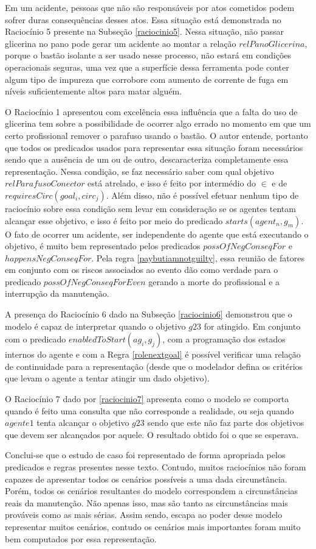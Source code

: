 Em um acidente, pessoas que não são responsáveis por atos cometidos podem sofrer duras consequências desses atos. Essa situação está demonstrada no Raciocínio 5 presente na Subseção \ref{raciocinio5}. Nessa situação, não passar glicerina no pano pode gerar um acidente ao montar a relação $relPanoGlicerina$, porque o bastão isolante a ser usado nesse  processo, não estará em condições operacionais seguras, uma vez que a superfície dessa ferramenta pode conter algum tipo de impureza que corrobore com aumento de corrente de fuga em níveis suficientemente altos para matar alguém. 

O Raciocínio 1 apresentou com excelência essa influência que a falta do uso de glicerina tem sobre a possibilidade de ocorrer algo errado no momento em que um certo profissional remover o parafuso usando o bastão. O autor entende, portanto que todos os predicados usados para representar essa situação foram necessários sendo que a ausência de um ou de outro, descaracteriza completamente essa representação. Nessa condição, se faz necessário saber com qual objetivo $relParafusoConector$ está atrelado, e isso é feito por intermédio do $\in$ e de $requiresCirc(goal_i,circ_j)$. Além disso, não é possível efetuar nenhum tipo de raciocínio sobre essa condição sem levar em consideração se os agentes tentam alcançar esse objetivo, e isso é feito por meio do predicado $starts(agent_n,g_m)$. O fato de ocorrer um acidente, ser independente do agente que está executando o objetivo, é muito bem representado pelos predicados $possOfNegConseqFor$ e $happensNegConseqFor$. Pela regra \ref{paybutiamnotguilty}, essa reunião de fatores em conjunto com os riscos associados ao evento dão como verdade para o predicado $possOfNegConseqForEven$ gerando a morte do profissional e a interrupção da manutenção. 

A presença do Raciocínio 6 dado na Subseção \ref{raciocinio6} demonstrou que o modelo é capaz de interpretar quando o objetivo $g23$ for atingido. Em conjunto com o predicado $enabledToStart(ag_i,g_j)$, com a programação dos estados internos do agente e com a Regra \ref{rolenextgoal} é possível verificar uma relação de continuidade para a representação (desde que o modelador defina os critérios que levam o agente a tentar atingir um dado objetivo). 

O Raciocínio 7 dado por \ref{raciocinio7} apresenta como o modelo se comporta quando é feito uma consulta que não corresponde a realidade, ou seja quando $agente1$ tenta alcançar o objetivo $g23$ sendo que este não faz parte dos objetivos que devem ser alcançados por aquele. O resultado obtido foi o que se esperava. 

Conclui-se que o estudo de caso foi representado de forma apropriada pelos predicados e regras presentes nesse texto. Contudo, muitos raciocínios não foram capazes de apresentar todos os cenários possíveis a uma dada circunstância. Porém, todos os cenários resultantes do modelo correspondem a circunstâncias reais da manutenção. Não apenas isso, mas são tanto as circunstâncias mais prováveis como as mais sérias. Assim sendo, escapa ao poder desse modelo representar muitos cenários, contudo os cenários mais importantes foram muito bem computados por essa representação.
